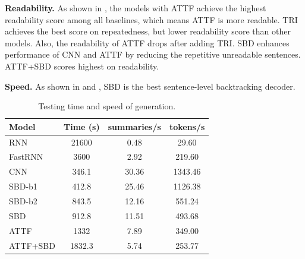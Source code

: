 \textbf{Readability.}
As shown in , 
the models with ATTF achieve the
highest readability score among all baselines, 
which means ATTF is more readable.
TRI achieves the best score on repeatedness, 
but lower readability score than other models.
Also, the readability of ATTF drops after adding TRI.
SBD enhances performance of CNN and ATTF by reducing the repetitive unreadable sentences. 
ATTF+SBD scores highest on readability.


\textbf{Speed.} 
As shown in  and , 
SBD is the best sentence-level backtracking decoder.

\begin{table}[th!]
\centering
\small
\begin{tabular}{|l|c|c|c|}
\hline
Model & Time (s) & summaries/s & tokens/s \\
\hline
RNN  &  21600 & 0.48 & 29.60 \\
FastRNN &  3600 & 2.92 & 219.60 \\
\hline
CNN &  346.1 & 30.36 & 1343.46 \\
SBD-b1 &  412.8 & 25.46 & 1126.38 \\
SBD-b2 &  843.5 & 12.16 & 551.24 \\
SBD &  912.8 & 11.51 & 493.68 \\
ATTF & 1332 & 7.89 &  349.00 \\
ATTF+SBD & 1832.3 & 5.74 &  253.77 \\
\hline
\end{tabular}
\caption{Testing time and speed of generation.}
\label{tab:eval_speed}
\end{table}


